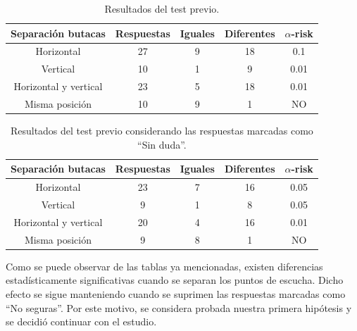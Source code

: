 \documentclass[11pt,a4paper,twoside]{book}
\begin{document}
            \begin{table}
			\begin{center}
			\begin{scriptsize}
			\begin{tabular}{| c | c | c | c || c |}
			    \hline
				\textbf{Separación butacas}&\textbf{Respuestas}&\textbf{Iguales}&\textbf{Diferentes}&\textbf{$\alpha$-risk}\\ \hline
                Horizontal&27&9&18&0.1\\ \hline
                Vertical&10&1&9&0.01\\ \hline
                Horizontal y vertical&23
                &5&18&0.01\\ \hline
                Misma posición&10&9&1&NO\\ \hline
			\end{tabular}
			\caption{Resultados del test previo.}
			\label{tablaResultadosDuda}
			\end{scriptsize}
			\end{center}	
		\end{table}	
		
		\begin{table}
			\begin{center}
			\begin{scriptsize}
			\begin{tabular}{| c | c | c | c || c |}
			    \hline
				\textbf{Separación butacas}&\textbf{Respuestas}&\textbf{Iguales}&\textbf{Diferentes}&\textbf{$\alpha$-risk}\\ \hline
                Horizontal&23&7&16&0.05\\ \hline
                Vertical&9&1&8&0.05\\ \hline
                Horizontal y vertical&20&4&16&0.01\\ \hline
                Misma posición&9&8&1&NO\\ \hline
			\end{tabular}
			\caption{Resultados del test previo considerando las respuestas marcadas como ``Sin duda''.}
			\label{tablaResultadosSinDuda}
			\end{scriptsize}
			\end{center}	
		\end{table}
		
		Como se puede observar de las tablas ya mencionadas, existen diferencias estadísticamente significativas cuando se separan los puntos de escucha. Dicho efecto se sigue manteniendo cuando se suprimen las respuestas marcadas como ``No seguras''. Por este motivo, se considera probada nuestra primera hipótesis y se decidió continuar con el estudio.
		
\end{document}
